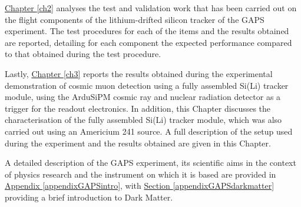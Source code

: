 \par
\hyperref[ch2]{Chapter \ref{ch2}} analyses the test and validation work that has been carried out on the flight components of the lithium-drifted silicon tracker of the GAPS experiment. The test procedures for each of the items and the results obtained are reported, detailing for each component the expected performance compared to that obtained during the test procedure.

\par
Lastly, \hyperref[ch3]{Chapter \ref{ch3}} reports the results obtained during the experimental demonstration of cosmic muon detection using a fully assembled Si(Li) tracker module, using the ArduSiPM cosmic ray and nuclear radiation detector as a trigger for the readout electronics. In addition, this Chapter discusses the characterisation of the fully assembled Si(Li) tracker module, which was also carried out using an Americium 241 source. A full description of the setup used during the experiment and the results obtained are given in this Chapter.

\par
A detailed description of the GAPS experiment, its scientific aims in the context of physics research and the instrument on which it is based are provided in \hyperref[appendixGAPSintro]{Appendix \ref{appendixGAPSintro}}, with \hyperref[appendixGAPSdarkmatter]{Section \ref{appendixGAPSdarkmatter}} providing a brief introduction to Dark Matter.